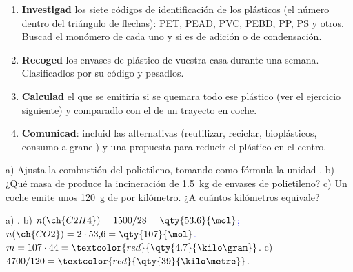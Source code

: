 \begin{enumerate}[label=\numberballred]
    \item \textbf{Investigad} los siete códigos de identificación de los plásticos (el número dentro del triángulo de flechas): PET,
    PEAD, PVC, PEBD, PP, PS y otros. Buscad el monómero de cada uno y si es de adición o de condensación.
    \item \textbf{Recoged} los envases de plástico de vuestra casa durante una semana. Clasificadlos por su código y pesadlos.
    \item \textbf{Calculad} el  que se emitiría si se quemara todo ese plástico (ver el ejercicio siguiente) y comparadlo
    con el de un trayecto en coche.
    \item \textbf{Comunicad}: incluid las alternativas (reutilizar, reciclar, bioplásticos, consumo a granel) y una propuesta para
    reducir el plástico en el centro.
\end{enumerate}

\begin{exercise}
    a) Ajusta la combustión del polietileno, tomando como fórmula la unidad . b) ¿Qué masa de  produce la
    incineración de \qty{1.5}{\kilo\gram} de envases de polietileno? c) Un coche emite unos \qty{120}{\gram} de  por
    kilómetro. ¿A cuántos kilómetros equivale?
    \begin{solu}
        a) \textcolor{red}{}. b) \textcolor{blue}{\(n(\ch{C2H4}) = 1500/28 = \qty{53.6}{\mol}\);
        \(n(\ch{CO2}) = 2 \cdot 53{,}6 = \qty{107}{\mol}\).} \(m = 107 \cdot 44 = \textcolor{red}{\qty{4.7}{\kilo\gram}}\).
        c) \(4700/120 = \textcolor{red}{\qty{39}{\kilo\metre}}\).
    \end{solu}
\end{exercise}

\fussy
